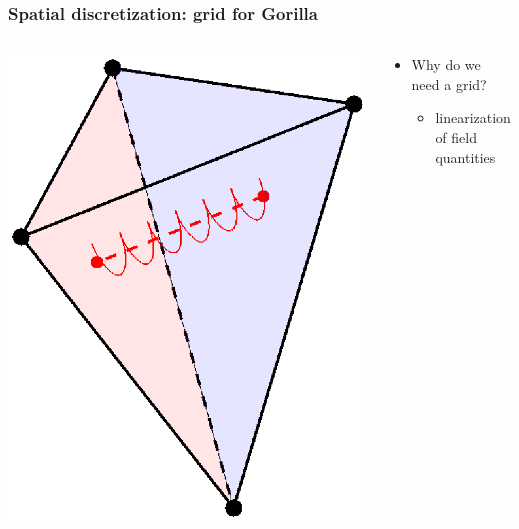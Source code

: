 \documentclass{beamer}
\begin{document}
\begin{frame}
\frametitle{Spatial discretization: grid for \textbf{Gorilla}}
\vspace{-1cm}
\begin{columns}[onlytextwidth]
	\begin{column}{0.4\textwidth}
			\begin{center}
		\vspace{-0cm}
		\includegraphics[trim={5cm 1cm 0cm 0cm},clip,width=1\textwidth,right]{FIGURES/tetrahedron_guiding_center.eps}
	\end{center}	
	\end{column}
	\begin{column}{0.6\textwidth}

\begin{itemize}
\item Why do we need a grid?\\
\begin{itemize}
\item linearization of field quantities\\


\end{itemize}
\end{itemize}
\end{column}
\end{columns}
\end{frame}
\end{document}
